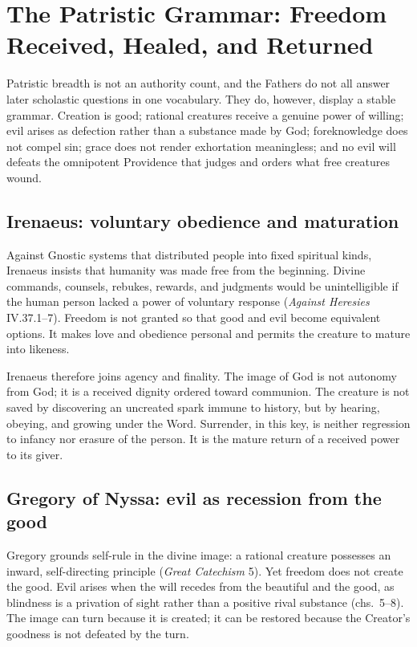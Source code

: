 \section{The Patristic Grammar: Freedom Received, Healed, and Returned}

Patristic breadth is not an authority count, and the Fathers do not all answer later scholastic questions in one vocabulary. They do, however, display a stable grammar. Creation is good; rational creatures receive a genuine power of willing; evil arises as defection rather than a substance made by God; foreknowledge does not compel sin; grace does not render exhortation meaningless; and no evil will defeats the omnipotent Providence that judges and orders what free creatures wound.

\subsection{Irenaeus: voluntary obedience and maturation}

Against Gnostic systems that distributed people into fixed spiritual kinds, Irenaeus insists that humanity was made free from the beginning. Divine commands, counsels, rebukes, rewards, and judgments would be unintelligible if the human person lacked a power of voluntary response (\emph{Against Heresies} IV.37.1--7). Freedom is not granted so that good and evil become equivalent options. It makes love and obedience personal and permits the creature to mature into likeness.

Irenaeus therefore joins agency and finality. The image of God is not autonomy from God; it is a received dignity ordered toward communion. The creature is not saved by discovering an uncreated spark immune to history, but by hearing, obeying, and growing under the Word. Surrender, in this key, is neither regression to infancy nor erasure of the person. It is the mature return of a received power to its giver.

\subsection{Gregory of Nyssa: evil as recession from the good}

Gregory grounds self-rule in the divine image: a rational creature possesses an inward, self-directing principle (\emph{Great Catechism} 5). Yet freedom does not create the good. Evil arises when the will recedes from the beautiful and the good, as blindness is a privation of sight rather than a positive rival substance (chs.~5--8). The image can turn because it is created; it can be restored because the Creator's goodness is not defeated by the turn.

